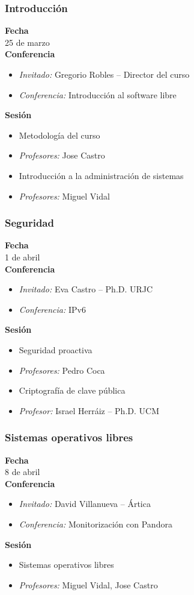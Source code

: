 \documentclass{beamer}
\begin{document}
\begin{frame}
  \frametitle{Introducción}
  \textbf{Fecha}\\
    25 de marzo\\
  \textbf{Conferencia}
    \begin{itemize}
      \item \textit{Invitado:} Gregorio Robles -- Director del curso
      \item \textit{Conferencia:} Introducción al software libre
    \end{itemize}
  \textbf{Sesión}
    \begin{itemize}
      \item Metodología del curso
      \item \textit{Profesores:} Jose Castro
    \end{itemize}
    \begin{itemize}
      \item Introducción a la administración de sistemas
      \item \textit{Profesores:} Miguel Vidal
    \end{itemize}
\end{frame}

\begin{frame}
  \frametitle{Seguridad}
  \textbf{Fecha}\\
    1 de abril\\
  \textbf{Conferencia}
    \begin{itemize}
      \item \textit{Invitado:} Eva Castro -- Ph.D. URJC
      \item \textit{Conferencia:} IPv6
    \end{itemize}
  \textbf{Sesión}
    \begin{itemize}
      \item Seguridad proactiva
      \item \textit{Profesores:} Pedro Coca 
    \end{itemize}
    \begin{itemize}
      \item Criptografía de clave pública
      \item \textit{Profesor:} Israel Herráiz -- Ph.D. UCM
    \end{itemize}
\end{frame}

\begin{frame}
  \frametitle{Sistemas operativos libres}
  \textbf{Fecha}\\
    8 de abril\\
  \textbf{Conferencia}
    \begin{itemize}
      \item \textit{Invitado:} David Villanueva -- Ártica
      \item \textit{Conferencia:} Monitorización con Pandora
    \end{itemize}
  \textbf{Sesión}
    \begin{itemize}
      \item Sistemas operativos libres
      \item \textit{Profesores:} Miguel Vidal, Jose Castro
    \end{itemize}
\end{frame}
\end{document}
